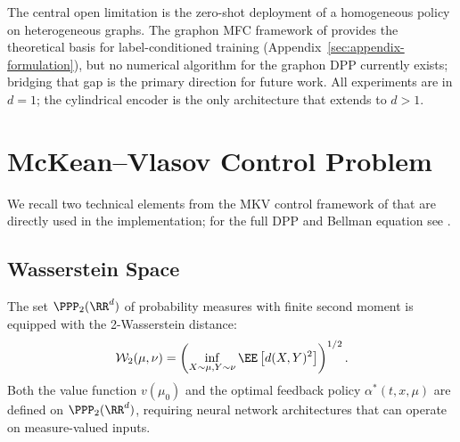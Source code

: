 \documentclass[11pt]{article}
\begin{document}
The central open limitation is the zero-shot deployment of a homogeneous policy on heterogeneous graphs. The graphon MFC framework of \citet{decrescenzo2025mfc} provides the theoretical basis for label-conditioned training (Appendix~\ref{sec:appendix-formulation}), but no numerical algorithm for the graphon DPP currently exists; bridging that gap is the primary direction for future work. All experiments are in $d = 1$; the cylindrical encoder is the only architecture that extends to $d > 1$.







\newpage
\appendix


\section{McKean--Vlasov Control Problem}\label{sec:appendix-mkv}

We recall two technical elements from the MKV control framework of \citet{pham2024mfnn} that are directly used in the implementation; for the full DPP and Bellman equation see \citet{carmona2018mfg1}.

\subsection{Wasserstein Space}

The set $\PPP_2(\RR^d)$ of probability measures with finite second moment is equipped with the 2-Wasserstein distance:
\begin{equation}\label{eq:wasserstein}
  \mathcal{W}_2(\mu, \nu) = \left( \inf_{X \sim \mu, Y \sim \nu} \EE\left[ d(X, Y)^2 \right] \right)^{1/2}.
\end{equation}
Both the value function $v(\mu_0)$ and the optimal feedback policy $\alpha^*(t,x,\mu)$ are defined on $\PPP_2(\RR^d)$, requiring neural network architectures that can operate on measure-valued inputs.
\end{document}
